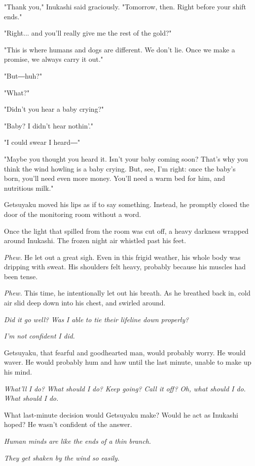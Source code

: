 "Thank you," Inukashi said graciously. "Tomorrow, then. Right before
your shift ends."

"Right... and you'll really give me the rest of the gold?"

"This is where humans and dogs are different. We don't lie. Once we make
a promise, we always carry it out."

"But―huh?"

"What?"

"Didn't you hear a baby crying?"

"Baby? I didn't hear nothin'."

"I could swear I heard―"

"Maybe you thought you heard it. Isn't your baby coming soon? That's why
you think the wind howling is a baby crying. But, see, I'm right: once
the baby's born, you'll need even more money. You'll need a warm bed for
him, and nutritious milk."

Getsuyaku moved his lips as if to say something. Instead, he promptly
closed the door of the monitoring room without a word.

Once the light that spilled from the room was cut off, a heavy darkness
wrapped around Inukashi. The frozen night air whistled past his feet.

\emph{Phew.} He let out a great sigh. Even in this frigid weather, his whole
body was dripping with sweat. His shoulders felt heavy, probably because
his muscles had been tense.

\emph{Phew.} This time, he intentionally let out his breath. As he breathed
back in, cold air slid deep down into his chest, and swirled around.

\emph{Did it go well? Was I able to tie their lifeline down properly?}

\emph{I'm not confident I did.}

Getsuyaku, that fearful and goodhearted man, would probably worry. He
would waver. He would probably hum and haw until the last minute, unable
to make up his mind.

\emph{What'll I do? What should I do? Keep going? Call it off? Oh, what should
	I do. What should I do.}

What last-minute decision would Getsuyaku make? Would he act as Inukashi
hoped? He wasn't confident of the answer.

\emph{Human minds are like the ends of a thin branch.}

\emph{They get shaken by the wind so easily.}

